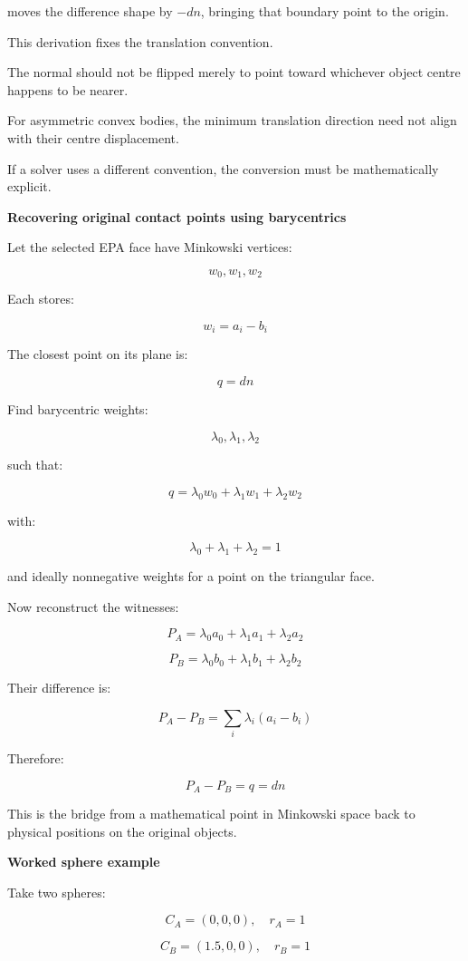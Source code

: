 moves the difference shape by \(-dn\), bringing that boundary point to the origin.

This derivation fixes the translation convention.

The normal should not be flipped merely to point toward whichever object centre happens to be nearer.

For asymmetric convex bodies, the minimum translation direction need not align with their centre displacement.

If a solver uses a different convention, the conversion must be mathematically explicit.

\textbf{Recovering original contact points using barycentrics}

Let the selected EPA face have Minkowski vertices:

\[
w_0,w_1,w_2
\]

Each stores:

\[
w_i=a_i-b_i
\]

The closest point on its plane is:

\[
q=dn
\]

Find barycentric weights:

\[
\lambda_0,\lambda_1,\lambda_2
\]

such that:

\[
\boxed{ q=\lambda_0w_0+\lambda_1w_1+\lambda_2w_2 }
\]

with:

\[
\lambda_0+\lambda_1+\lambda_2=1
\]

and ideally nonnegative weights for a point on the triangular face.

Now reconstruct the witnesses:

\[
\boxed{ P_A=\lambda_0a_0+\lambda_1a_1+\lambda_2a_2 }
\]

\[
\boxed{ P_B=\lambda_0b_0+\lambda_1b_1+\lambda_2b_2 }
\]

Their difference is:

\[
P_A-P_B = \sum_i\lambda_i(a_i-b_i)
\]

Therefore:

\[
\boxed{ P_A-P_B=q=dn }
\]

This is the bridge from a mathematical point in Minkowski space back to physical positions on the original objects.

\textbf{Worked sphere example}

Take two spheres:

\[
C_A=(0,0,0),\quad r_A=1
\]

\[
C_B=(1.5,0,0),\quad r_B=1
\]

